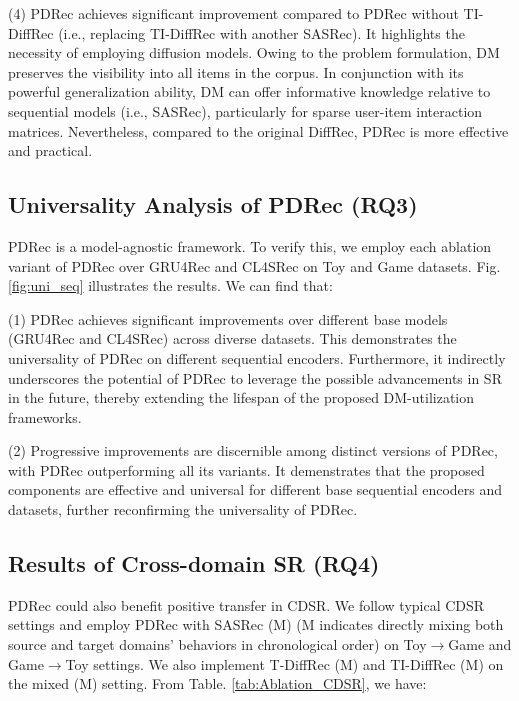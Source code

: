 \documentclass[letterpaper]{article} %
\begin{document}
(4) PDRec achieves significant improvement compared to PDRec without TI-DiffRec (i.e., replacing TI-DiffRec with another SASRec). It highlights the necessity of employing diffusion models. Owing to the problem formulation, DM preserves the visibility into all items in the corpus. In conjunction with its powerful generalization ability, DM can offer informative knowledge relative to sequential models (i.e., SASRec), particularly for sparse user-item interaction matrices. Nevertheless, compared to the original DiffRec, PDRec is more effective and practical.


\subsection{Universality Analysis of PDRec (RQ3)}
\label{sec.uni_seq}
PDRec is a model-agnostic framework. To verify this, we employ each ablation variant of PDRec over GRU4Rec \cite{GRU4Rec} and CL4SRec \cite{CL4SRec} on Toy and Game datasets. Fig. \ref{fig:uni_seq} illustrates the results. We can find that:

(1) PDRec achieves significant improvements over different base models (GRU4Rec and CL4SRec) across diverse datasets. This demonstrates the universality of PDRec on different sequential encoders. Furthermore, it indirectly underscores the potential of PDRec to leverage the possible advancements in SR in the future, thereby extending the lifespan of the proposed DM-utilization frameworks.

(2) Progressive improvements are discernible among distinct versions of PDRec, with PDRec outperforming all its variants. It demenstrates that the proposed components are effective and universal for different base sequential encoders and datasets, further reconfirming the universality of PDRec.



\subsection{Results of Cross-domain SR (RQ4)}
\label{sec.uni_scen}

PDRec could also benefit positive transfer in CDSR. We follow typical CDSR settings \cite{Tri-CDR, DDGHM} and employ PDRec with SASRec (M) (M indicates directly mixing both source and target domains' behaviors in chronological order) on Toy$\rightarrow$Game and Game$\rightarrow$Toy settings. We also implement T-DiffRec (M) and TI-DiffRec (M) on the mixed (M) setting. From Table. \ref{tab:Ablation_CDSR}, we have:
\end{document}
